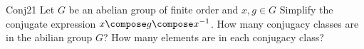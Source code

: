 %

%
%
%

\begin {exercise}{Conj21}
Let $G$ be an abelian group of finite order and $x,g\in G$
Simplify the conjugate expression $x\compose g\compose x^{-1}$.  How many conjugacy classes are in the abilian group $G$? How many elements are in each conjugacy class? 
\end{exercise}